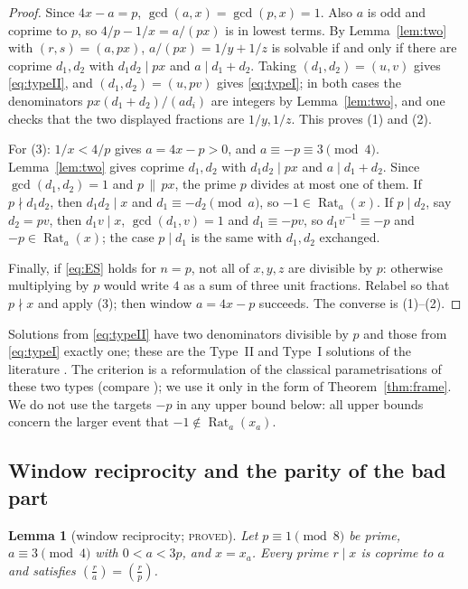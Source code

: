 \documentclass[11pt,reqno]{amsart}
\newtheorem{lemma}[theorem]{Lemma}
\theoremstyle{definition}
\newcommand{\Rat}{\operatorname{Rat}}
\newcommand{\leg}[2]{\left(\frac{#1}{#2}\right)}
\newcommand{\status}[1]{\textup{\textsc{#1}}}
\begin{document}
\begin{proof}
Since $4x-a=p$, $\gcd(a,x)=\gcd(p,x)=1$.  Also $a$ is odd and coprime to
$p$, so $4/p-1/x=a/(px)$ is in lowest terms.  By Lemma~\ref{lem:two} with
$(r,s)=(a,px)$, $a/(px)=1/y+1/z$ is solvable if and only if there are coprime
$d_1,d_2$ with $d_1d_2\mid px$ and $a\mid d_1+d_2$.  Taking $(d_1,d_2)=(u,v)$
gives \eqref{eq:typeII}, and $(d_1,d_2)=(u,pv)$ gives \eqref{eq:typeI}; in
both cases the denominators $px(d_1+d_2)/(ad_i)$ are integers by
Lemma~\ref{lem:two}, and one checks that the two displayed fractions are
$1/y,1/z$.  This proves (1) and (2).

For (3): $1/x<4/p$ gives $a=4x-p>0$, and $a\equiv-p\equiv3\pmod4$.
Lemma~\ref{lem:two} gives coprime $d_1,d_2$ with $d_1d_2\mid px$ and
$a\mid d_1+d_2$.  Since $\gcd(d_1,d_2)=1$ and $p\,\|\,px$, the prime $p$
divides at most one of them.  If $p\nmid d_1d_2$, then $d_1d_2\mid x$ and
$d_1\equiv-d_2\pmod a$, so $-1\in\Rat_a(x)$.  If $p\mid d_2$, say
$d_2=pv$, then $d_1v\mid x$, $\gcd(d_1,v)=1$ and $d_1\equiv-pv$, so $d_1v^{-1}\equiv-p$ and
$-p\in\Rat_a(x)$; the case $p\mid d_1$ is the same with $d_1,d_2$
exchanged.

Finally, if \eqref{eq:ES} holds for $n=p$, not all of $x,y,z$ are
divisible by $p$: otherwise multiplying by $p$ would write $4$ as a sum of
three unit fractions.  Relabel so that $p\nmid x$ and apply (3); then
window $a=4x-p$ succeeds.  The converse is (1)--(2).
\end{proof}

Solutions from \eqref{eq:typeII} have two denominators divisible by $p$
and those from \eqref{eq:typeI} exactly one; these are the Type~II and
Type~I solutions of the literature \cite{ET}.  The criterion is a
reformulation of the classical parametrisations of these two types
(compare \cite[\S2]{ET}); we use it only in the form of
Theorem~\ref{thm:frame}.  We do not use the targets $-p$ in any upper
bound below: all upper bounds concern the larger event that $-1\notin
\Rat_a(x_a)$.

\subsection{Window reciprocity and the parity of the bad part}

\begin{lemma}[window reciprocity; \status{proved}]\label{lem:recip}
Let $p\equiv1\pmod8$ be prime, $a\equiv3\pmod4$ with $0<a<3p$, and
$x=x_a$.  Every prime $r\mid x$ is coprime to $a$ and satisfies
$\leg ra=\leg rp$.
\end{lemma}
\end{document}
